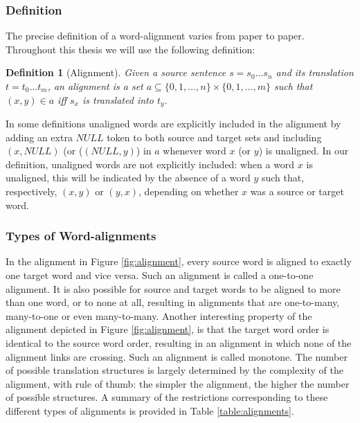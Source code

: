 \documentclass{report}
\theoremstyle{break}
\newtheorem{definition}{Definition}
\begin{document}
\subsubsection{Definition}

The precise definition of a word-alignment varies from paper to paper. Throughout this thesis we will use the following definition:

\begin{definition}[Alignment]\label{def:alignment}
Given a source sentence $s = s_0 \ldots s_n$ and its translation $t = t_0 \ldots t_m$, an alignment is a set $a \subseteq \{0,1,\ldots,n\} \times \{0,1,\ldots,m\}$ such that $(x,y)\in a$ iff $s_x$ is translated into $t_y$.
\end{definition}

In some definitions unaligned words are explicitly included in the alignment by adding an extra $NULL$ token to both source and target sets and including $(x,NULL)$ (or ($(NULL,y)$) in $a$ whenever word $x$ (or $y$) is unaligned. In our definition, unaligned words are not explicitly included: when a word $x$ is unaligned, this will be indicated by the absence of a word $y$ such that, respectively, $(x,y)$ or $(y,x)$, depending on whether $x$ was a source or target word. 


\subsubsection{Types of Word-alignments}

In the alignment in Figure \ref{fig:alignment}, every source word is aligned to exactly one target word and vice versa. Such an alignment is called a one-to-one alignment. It is also possible for source and target words to be aligned to more than one word, or to none at all, resulting in alignments that are one-to-many, many-to-one or even many-to-many. Another interesting property of the alignment depicted in Figure \ref{fig:alignment}, is that the target word order is identical to the source word order, resulting in an alignment in which none of the alignment links are crossing. Such an alignment is called monotone. The number of possible translation structures is largely determined by the complexity of the alignment, with rule of thumb: the simpler the alignment, the higher the number of possible structures. A summary of the restrictions corresponding to these different types of alignments is provided in Table \ref{table:alignments}.
\end{document}
